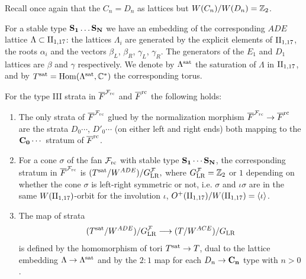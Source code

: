 \documentclass[table,x11names]{amsart}
\begin{document}
Recall once again that the $C_n=D_n$ as lattices but
$W(C_n)/W(D_n)={\mathbb Z}_2$.

\begin{definition}
  For a stable type ${\bf S_1\dots S_N}$ we have an embedding of
  the corresponding $ADE$  lattice
  $\Lambda \subset \IIell$: the lattices $\Lambda_i$ are generated by
  the explicit elements of $\IIell$, the roots $\alpha_i$ and the
  vectors $\beta_L$, $\beta_R$, $\gamma_L$, $\gamma_R$. The generators
  of the $E_1$ and $D_1$ lattices are $\beta$ and $\gamma$ respectively.
  We denote by $\Lambda^{\rm sat}$ the saturation of $\Lambda$ in $\IIell$, and
  by $T^{\rm sat} = \operatorname{Hom}(\Lambda^{\rm sat},{\mathbb C}^*)$ the corresponding torus.
\end{definition}

\begin{theorem}\label{thm:map-strata}
  For the type III strata in ${\overline F}^{{\mathcal F}_{\rm rc}}$ and ${\overline F}^{{\rm rc}}$ the following holds:
  \begin{enumerate}
  \item The only strata of ${\overline F}^{{\mathcal F}_{\rm rc}}$ glued by the normalization
    morphism ${\overline F}^{{\mathcal F}_{\rm rc}}\to{\overline F}^{{\rm rc}}$ are the strata $D_0\cdots$,
    $D'_0\cdots$ (on either left and right ends) both mapping to
    the ${\bf C_0}\cdots$ stratum of ${\overline F}^{{\rm rc}}$.
  \item For a cone $\sigma$ of the fan ${\mathcal F}_{\rm rc}$ with stable type
    ${\bf S_1\cdots S_N}$, the corresponding stratum in ${\overline F}^{{\mathcal F}_{\rm rc}}$ is
    \begin{math}
      (T^{\rm sat} / W^{ADE}) / G^{\mathcal F}_{{\rm LR}},
    \end{math}
    where $G^{\mathcal F}_{\rm LR} = {\mathbb Z}_2$ or $1$ depending on whether the cone
    $\sigma$ is left-right symmetric or not, i.e. $\sigma$ and
    $\iota\sigma$ are in the same $W(\IIell)$-orbit for the involution
    $\iota$, $O^+(\II_{1,17}) / W(\IIell) = \la\iota\ra$.
  \item The map of strata
    \begin{displaymath}
      (T^{\rm sat} / W^{ADE}) / G^{\mathcal F}_{{\rm LR}} \longrightarrow
      (T / W^{ACE}) / G_{{\rm LR}}
    \end{displaymath}
    is defined by the homomorphism of tori $T^{\rm sat}\to T$, dual to the
    lattice embedding $\Lambda\to\Lambda^{\rm sat}$ and by the $2:1$ map for
    each $D_n\to {\bf C_n}$ type with $n>0$. 
  \end{enumerate}
\end{theorem}
\end{document}
